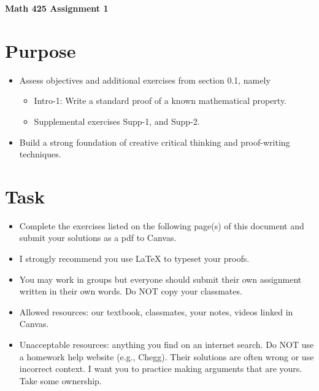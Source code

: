 \documentclass[12pt]{article}
\begin{document}
	\begin{center}
		{\Large \bf Math 425 Assignment 1}
	\end{center}
	\section*{Purpose}
		\begin{itemize}
			\item Assess objectives and additional exercises from section 0.1, namely
				\begin{itemize}
					\item Intro-1: Write a standard proof of a known mathematical property.
					\item Supplemental exercises Supp-1, and Supp-2. 
				\end{itemize}
			\item Build a strong foundation of creative critical thinking and proof-writing techniques.
		\end{itemize}
	\section*{Task}
		\begin{itemize}
			\item Complete the exercises listed on the following page(s) of this document and submit your solutions as a pdf to Canvas.
			\item I strongly recommend you use LaTeX to typeset your proofs.
			\item You may work in groups but everyone should submit their own assignment written in their own words.  Do NOT copy your classmates.
			\item Allowed resources: our textbook, classmates, your notes, videos linked in Canvas.
			\item Unacceptable resources: anything you find on an internet search. Do NOT use a homework help website (e.g., Chegg). Their solutions are often wrong or use incorrect context.  I want you to practice making arguments that are yours. Take some ownership.
		\end{itemize}
\end{document}
